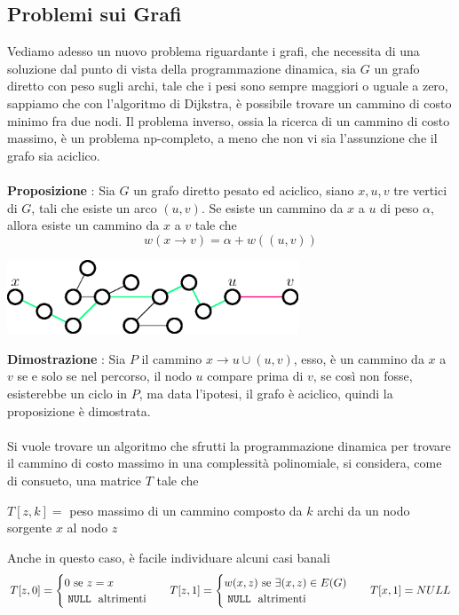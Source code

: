 \documentclass[12pt, letterpaper]{article}
\newcommand{\codee}[1]{\colorbox{white}{\texttt{#1}}}
\newcommand{\acc}{\\\hphantom{}\\}
\begin{document}
\subsection{Problemi sui Grafi}
Vediamo adesso un nuovo problema riguardante i grafi, che necessita di una soluzione dal punto di vista della programmazione
dinamica, sia $G$ un grafo diretto con peso sugli archi, tale che i pesi sono sempre maggiori o uguale a zero, sappiamo che
con l'algoritmo di Dijkstra, è possibile trovare un cammino di costo minimo fra due nodi. Il problema inverso, ossia la ricerca
di un cammino di costo massimo, è un problema np-completo, a meno che non vi sia l'assunzione che il grafo sia aciclico.\acc
\textbf{Proposizione} : Sia $G$ un grafo diretto pesato ed aciclico, siano $x,u,v$ tre vertici di $G$, tali che esiste
un arco $(u,v)$. Se esiste un cammino da $x$ a $u$ di peso $\alpha$, allora esiste un cammino da $x$ a $v$ tale che
$$ w(x\rightarrow v)=\alpha + w((u,v))$$ \begin{center}
    \includegraphics[width=0.65\textwidth ]{images/cammCostoMax.eps}
\end{center}
\textbf{Dimostrazione} : Sia $P$ il cammino $x\rightarrow u \cup (u,v)$, esso, è un cammino da $x$ a $v$ se e solo
se nel percorso, il nodo $u$ compare prima di $v$, se così non fosse, esisterebbe un ciclo in $P$, ma data l'ipotesi,
il grafo è aciclico, quindi la proposizione è dimostrata.\acc
Si vuole trovare un algoritmo che sfrutti la programmazione dinamica per trovare il cammino di costo massimo in una complessità
polinomiale, si considera, come di consueto, una matrice $T$ tale che\begin{center}
    $T[z,k]=$ peso massimo di un cammino composto da $k$ archi da un nodo sorgente $x$ al nodo $z$
\end{center}
Anche in questo caso, è facile individuare alcuni casi banali
$$ T[z,0]=\begin{cases}
        0\text{ se }z=x \\
        \text{\codee{NULL} altrimenti}
    \end{cases}\;\;\;T[z,1]=\begin{cases}
        w(x,z)\text{ se }\exists (x,z)\in E(G) \\
        \text{\codee{NULL} altrimenti}
    \end{cases}\;\;\;T[x,1]=NULL$$
\end{document}
